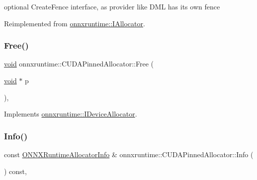 optional Create\+Fence interface, as provider like D\+ML has its own fence 

Reimplemented from \mbox{\hyperlink{classonnxruntime_1_1IAllocator_aac50b97886138b30cd0b7b3506fea459}{onnxruntime\+::\+I\+Allocator}}.

\mbox{\label{classonnxruntime_1_1CUDAPinnedAllocator_a2d28c8305e862060b9e5337073cda109}} 
\subsubsection{\texorpdfstring{Free()}{Free()}}
{\footnotesize\ttfamily \mbox{\hyperlink{mlasi_8h_a88f941d423cb2a819b70a1358982b1a6}{void}} onnxruntime\+::\+C\+U\+D\+A\+Pinned\+Allocator\+::\+Free (\begin{DoxyParamCaption}\item[{\mbox{\hyperlink{mlasi_8h_a88f941d423cb2a819b70a1358982b1a6}{void}} $\ast$}]{p }\end{DoxyParamCaption})\hspace{0.3cm}{\ttfamily [override]}, {\ttfamily [virtual]}}



Implements \mbox{\hyperlink{classonnxruntime_1_1IDeviceAllocator_aeabef1862123ae6d9478199db974e32a}{onnxruntime\+::\+I\+Device\+Allocator}}.

\mbox{\label{classonnxruntime_1_1CUDAPinnedAllocator_af08d82e6f7b890059386326ac371950a}} 
\subsubsection{\texorpdfstring{Info()}{Info()}}
{\footnotesize\ttfamily const \mbox{\hyperlink{structONNXRuntimeAllocatorInfo}{O\+N\+N\+X\+Runtime\+Allocator\+Info}} \& onnxruntime\+::\+C\+U\+D\+A\+Pinned\+Allocator\+::\+Info (\begin{DoxyParamCaption}{ }\end{DoxyParamCaption}) const\hspace{0.3cm}{\ttfamily [override]}, {\ttfamily [virtual]}}




